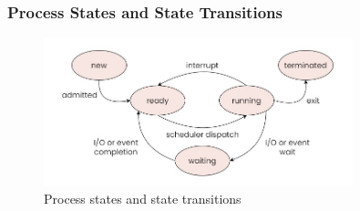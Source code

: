 \documentclass[12pt]{article}
\begin{document}
    \subsubsection{Process States and State Transitions}
\begin{figure}[h]
    \centering
    \includegraphics[width=0.8\textwidth]{asset/process-state.jpg}
    \caption{Process states and state transitions}
    \label{fig:process_state}
\end{figure}
\end{document}
